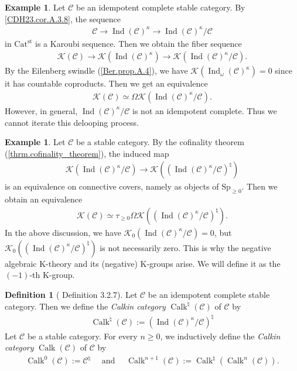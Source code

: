 \documentclass[a4paper,dvipdfmx,11pt,reqno]{amsart}
\newcommand{\C}{\mathcal{C}}
\newcommand{\K}{\mathcal{K}}
\DeclareMathOperator{\Ind}{Ind}
\DeclareMathOperator{\Calk}{Calk}
\newcommand{\Catst}{\mathrm{Cat^{st}}}
\newcommand{\Sp}{\mathrm{Sp}}
\theoremstyle{definition}
\newtheorem{definition}[theorem]{Definition}
\newtheorem{example}[theorem]{Example}
\begin{document}
\begin{example}
  Let $\C$ be an idempotent complete stable category.
  By \cref{CDH23.cor.A.3.8}, the sequence
  \begin{align*}
    \C \to \Ind(\C)^{\kappa} \to \Ind(\C)^{\kappa}/\C
  \end{align*}
  in $\Catst$ is a Karoubi sequence.
  Then we obtain the fiber sequence
  \begin{align*}
    \K(\C) \to \K(\Ind(\C)^{\kappa}) \to \K(\Ind(\C)^{\kappa}/\C).
  \end{align*}
  By the Eilenberg swindle (\cref{Ber.prop.A.4}), we have $\K(\Ind_{\omega}(\C)^{\kappa}) = 0$ since it has countable coproducts.
  Then we get an equivalence
  \begin{align*}
    \K(\C)
    \simeq \Omega\K(\Ind(\C)^{\kappa}/\C).
  \end{align*}
  However, in general, $\Ind(\C)^{\kappa}/\C$ is not an idempotent complete.
  Thus we cannot iterate this delooping process.
\end{example}  

\begin{example}
  Let $\C$ be a stable category.
  By the cofinality theorem (\cref{thrm.cofinality_theorem}), the induced map 
  \begin{align*}
    \K(\Ind(\C)^{\kappa}/\C) \to \K((\Ind(\C)^{\kappa}/\C)^{\natural})
  \end{align*}
  is an equivalence on connective covers, namely as objects of $\Sp_{\geq 0}$.
  Then we obtain an equivalence
  \begin{align*}
    \K(\C) 
    \simeq \tau_{\geq 0}\Omega\K((\Ind(\C)^{\kappa}/\C)^{\natural}).
  \end{align*}
  In the above discussion, we have $\K_0(\Ind(\C)^{\kappa}/\C) = 0$, but $\K_0((\Ind(\C)^{\kappa}/\C)^{\natural})$ is not necessarily zero.
  This is why the negative algebraic K-theory and its (negative) K-groups arise.
  We will define it as the $(-1)$-th K-group.
\end{example}

\begin{definition}[\cite{KNP24} Definition 3.2.7] \label{KNP24.def.3.2.7}
  Let $\C$ be an idempotent complete stable category.
  Then we define the \textit{Calkin category} $\Calk^{\natural}(\C)$ of $\C$ by
  \begin{align*}
    \Calk^{\natural}(\C) 
    := (\Ind(\C)^{\kappa}/\C)^{\natural}
  \end{align*}
  Let $\C$ be a stable category.
  For every $n \geq 0$, we inductively define the \textit{Calkin category} $\Calk(\C)$ of $\C$ by 
  \begin{align*}
    \Calk^0(\C) 
    := \C^{\natural}
    \quad \text{ and } \quad 
    \Calk^{n+1}(\C) 
    := \Calk^{\natural}(\Calk^n(\C)).
  \end{align*}
\end{definition}
\end{document}
